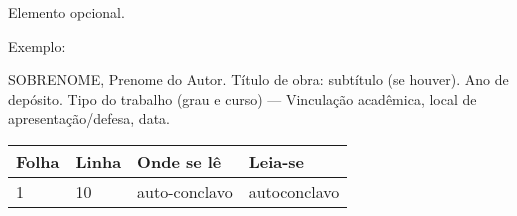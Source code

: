 
\begin{errata}
Elemento opcional. 

Exemplo:

\vspace{\onelineskip}

SOBRENOME, Prenome do Autor. Título de obra: subtítulo (se houver). Ano de depósito. Tipo do trabalho (grau e curso) --- Vinculação acadêmica, local de apresentação/defesa, data.

\begin{table}[htb]
\center
\begin{tabular}{|p{2.4cm}|p{2cm}|p{3cm}|p{3cm}|}
  \hline
   \textbf{Folha} & \textbf{Linha}  & \textbf{Onde se lê}  & \textbf{Leia-se}  \\
    \hline
    1 & 10 & auto-conclavo & autoconclavo\\
   \hline
\end{tabular}
\end{table}

\end{errata}
